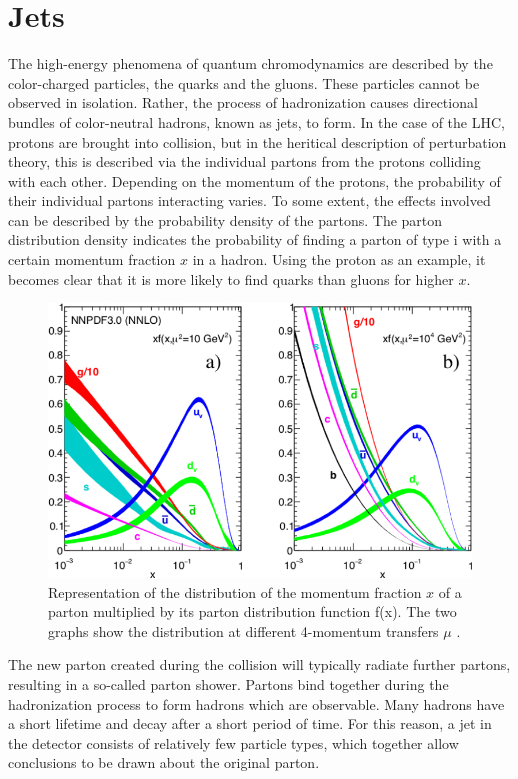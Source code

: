 \documentclass[12pt, a4paper]{thesis}
\begin{document}
\section{Jets}
\label{sec:org85fb1e4}

The high-energy phenomena of quantum chromodynamics are described by
the color-charged particles, the quarks and the gluons. These
particles cannot be observed in isolation. Rather, the process of
hadronization causes directional bundles of color-neutral hadrons,
known as jets, to form. In the case of the LHC, protons are brought
into collision, but in the heritical description of perturbation
theory, this is described via the individual partons from the protons
colliding with each other. Depending on the momentum of the protons,
the probability of their individual partons interacting varies. To
some extent, the effects involved can be described by the probability
density of the partons. The parton distribution density indicates the
probability of finding a parton of type i with a certain momentum
fraction \(x\) in a hadron. Using the proton as an example, it becomes
clear that it is more likely to find quarks than gluons for higher
\(x\).

\begin{figure}[hbtp]
  \centering
  \includegraphics[width=0.8 \textwidth]{../images/partondensity.jpeg}
  \caption{Representation of the distribution of the momentum fraction
    $x$ of a parton multiplied by its parton distribution function
    f(x). The two graphs show the distribution at different 4-momentum
    transfers $\mu$ \cite{PhysRevD.98.030001}.}
  \label{bremsstrahlung}
\end{figure}

The new parton created during the collision will typically radiate
further partons, resulting in a so-called parton shower. Partons bind
together during the hadronization process to form hadrons which are
observable. Many hadrons have a short lifetime and decay after a short
period of time. For this reason, a jet in the detector consists of
relatively few particle types, which together allow conclusions to be
drawn about the original parton.
\end{document}
